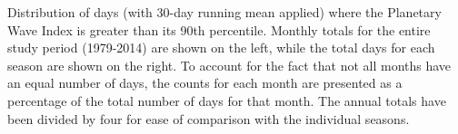 \label{fig:annual_distribution}
Distribution of days (with 30-day running mean applied) where the Planetary Wave Index is greater than its 90th percentile. Monthly totals for the entire study period (1979-2014) are shown on the left, while the total days for each season are shown on the right. To account for the fact that not all months have an equal number of days, the counts for each month are presented as a percentage of the total number of days for that month. The annual totals have been divided by four for ease of comparison with the individual seasons.   